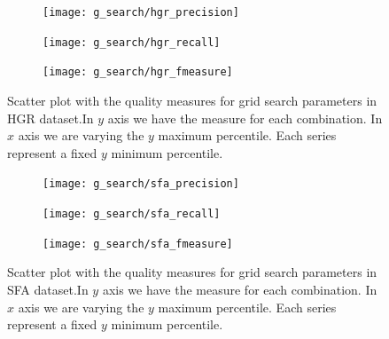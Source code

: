 \clearpage %
\begin{figure}[!htb]
    \centering
    \begin{subfigure}[t]{0.95\textwidth}
        \texttt{[image: g\_search/hgr\_precision]}
    \end{subfigure}
    \begin{subfigure}[t]{0.95\textwidth}
        \texttt{[image: g\_search/hgr\_recall]}
    \end{subfigure}
    \begin{subfigure}[t]{0.95\textwidth}
        \texttt{[image: g\_search/hgr\_fmeasure]}
    \end{subfigure}
    \caption[Scatter plot with the quality measures for grid search parameters in HGR dataset]{Scatter plot with the quality measures for grid search parameters in HGR dataset.In $y$ axis we have the measure for each combination. In $x$ axis we are varying the $y$ maximum percentile. Each series represent a fixed $y$ minimum percentile.}
    \label{fig:hgr_g_search}
\end{figure}


\clearpage %
\begin{figure}[!htb]
    \centering
    \begin{subfigure}[t]{0.95\textwidth}
        \texttt{[image: g\_search/sfa\_precision]}
    \end{subfigure}
    \begin{subfigure}[t]{0.95\textwidth}
        \texttt{[image: g\_search/sfa\_recall]}
    \end{subfigure}
    \begin{subfigure}[t]{0.95\textwidth}
        \texttt{[image: g\_search/sfa\_fmeasure]}
    \end{subfigure}
    \caption[Scatter plot with the quality measures for grid search parameters in SFA dataset]{Scatter plot with the quality measures for grid search parameters in SFA dataset.In $y$ axis we have the measure for each combination. In $x$ axis we are varying the $y$ maximum percentile. Each series represent a fixed $y$ minimum percentile.}
    \label{fig:sfa_g_search}
\end{figure}
